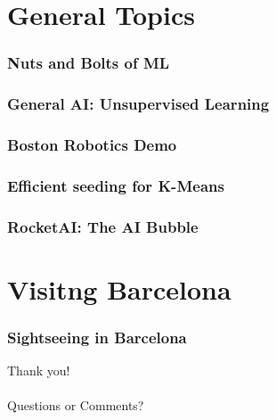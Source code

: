 \documentclass[11pt,
               hyperref={colorlinks,citecolor=pink,linkcolor=red,urlcolor=blue}
               ]{beamer}
\begin{document}
  \section{General Topics}

  \begin{frame}
    \frametitle{Nuts and Bolts of ML}

  \end{frame}

  \begin{frame}
    \frametitle{General AI: Unsupervised Learning}

  \end{frame}

  \begin{frame}
    \frametitle{Boston Robotics Demo}

  \end{frame}

  \begin{frame}
    \frametitle{Efficient seeding for K-Means}

  \end{frame}

  \begin{frame}
    \frametitle{RocketAI: The AI Bubble}

  \end{frame}

  \section{Visitng Barcelona}

  \begin{frame}
    \frametitle{Sightseeing in Barcelona}

  \end{frame}

  \begin{frame}[noframenumbering]

    \begin{center}
      \Huge{Thank you!}\\~\\
      \huge{Questions or Comments?}
    \end{center}
  \end{frame}
\end{document}
